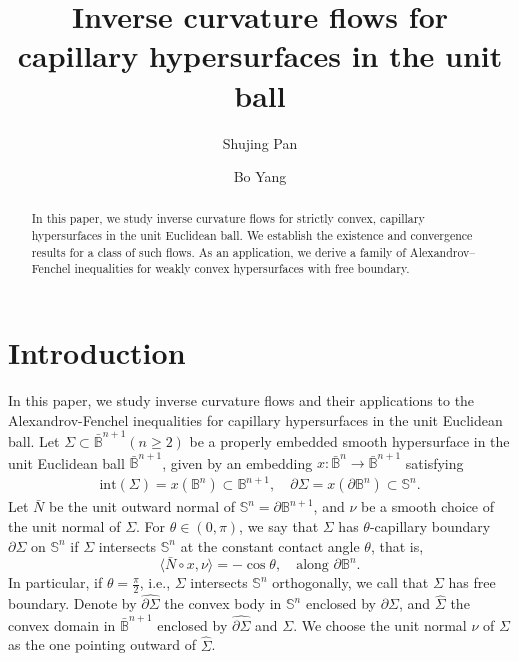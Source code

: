 \documentclass[11pt,reqno]{amsart}
\theoremstyle{definition}
\theoremstyle{remark}
\numberwithin{equation}{section}
\renewcommand{\(}{\left(}
\renewcommand{\)}{\right)}
\renewcommand{\-}{\overline}
\renewcommand{\t}{\theta}
\begin{document}
	\title[Inverse curvature flows in unit ball]{Inverse curvature flows for capillary hypersurfaces in the unit ball}	
\author[S. Pan]{Shujing Pan}
\address{School of Mathematical Sciences, University of Science and Technology of China, Hefei 230026, P.R. China}
\author[B. Yang]{Bo Yang}
\address{Department of Mathematical Sciences, Tsinghua University, Beijing 100084, P.R. China}
	

	\begin{abstract}
In this paper, we study inverse curvature flows for strictly convex, capillary hypersurfaces in the unit Euclidean ball. We establish the existence and convergence results for a class of such flows. As an application, we derive a family of Alexandrov–Fenchel inequalities for weakly convex hypersurfaces with free boundary.
	\end{abstract}	
	\maketitle
		\tableofcontents
\section{Introduction}

In this paper, we study inverse curvature flows and their applications to the Alexandrov-Fenchel inequalities for capillary hypersurfaces in the unit Euclidean ball. Let $\Sigma\subset\bar{\mathbb{B}}^{n+1} (n\geq 2)$ be a properly embedded smooth hypersurface in the unit Euclidean ball $\bar{\mathbb{B}}^{n+1}$, given by an embedding $x:\bar{\mathbb{B}}^n\to\bar{\mathbb{B}}^{n+1}$ satisfying
\begin{align*}
	\mathrm{int}(\Sigma)=x(\mathbb{B}^n)\subset \mathbb{B}^{n+1},\quad  \partial\Sigma=x(\partial\mathbb{B}^n)\subset \mathbb{S}^n.
\end{align*}
Let $\bar{N}$ be the unit outward normal of $\mathbb S^n=\partial \mathbb B^{n+1}$, and $\nu$ be a smooth choice of the unit normal of $\Sigma$. For $\theta\in(0,\pi)$, we say that $\Sigma$ has  $\theta$-capillary boundary $\partial\Sigma$ on $\mathbb{S}^n$ if $\Sigma$ intersects $\mathbb S^n$ at the constant contact angle $\t$, that is,
\begin{equation*}
	\langle\bar{N}\circ x,\nu\rangle =-\cos\theta, \quad \text{along $\partial \mathbb B^n$}.
\end{equation*}
In particular, if $\theta=\frac{\pi}{2}$, i.e., $\Sigma$ intersects $\mathbb S^n$ orthogonally, we call that $\Sigma$ has free boundary. Denote by $\widehat{\partial\Sigma}$ the convex body in $\mathbb{S}^n$ enclosed by $\partial \Sigma$, and $\widehat{\Sigma}$ the convex domain in $\bar{\mathbb{B}}^{n+1}$ enclosed by $\widehat{\partial\Sigma}$ and $\Sigma$. We choose the unit normal $\nu$ of $\Sigma$ as the one pointing outward of $\widehat{\Sigma}$.
\end{document}
